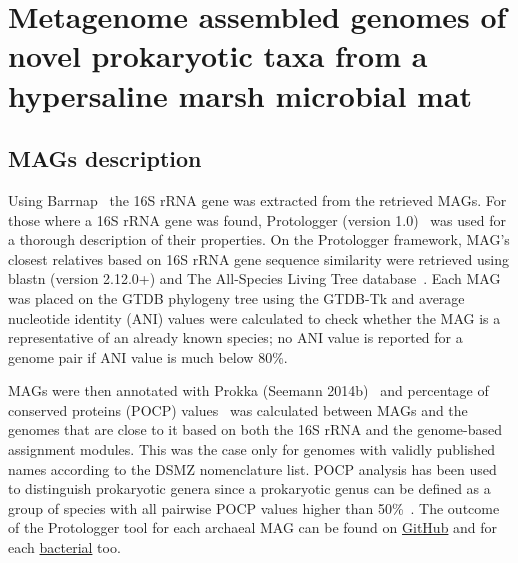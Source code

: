 \chapter{Metagenome assembled genomes of novel prokaryotic taxa from a hypersaline marsh microbial mat}
\label{app:mags}

\section{MAGs description}

    Using Barrnap~\citep{seemann_barrnap_2014} the 16S rRNA gene was extracted from the retrieved MAGs. 
    For those where a 16S rRNA gene was found, Protologger (version 1.0)~\citep{hitch_automated_2021} 
    was used for a thorough description of their properties. 
    On the Protologger framework, MAG’s closest relatives based on 16S rRNA gene sequence similarity were retrieved using 
    blastn (version 2.12.0+) and The All-Species Living Tree database~\citep{ludwig_release_2021}. 
    Each MAG was placed on the GTDB phylogeny tree using the GTDB-Tk and average nucleotide identity (ANI) values 
    were calculated to check whether the MAG is a representative of an already known species; 
    no ANI value is reported for a genome pair if ANI value is much below 80\%. 

    MAGs were then annotated with Prokka (Seemann 2014b)~\citep{seemann_prokka_2014} 
    and percentage of conserved proteins (POCP) values~\citep{qin_proposed_2014}  
    was calculated between MAGs and the genomes that are close to it based on both the 16S rRNA and the genome-based assignment modules. 
    This was the case only for genomes with validly published names according to the DSMZ nomenclature list. 
    POCP analysis has been used to distinguish prokaryotic genera since a prokaryotic genus can be defined as a group of species 
    with all pairwise POCP values higher than 50\%~\citep{qin_proposed_2014}. 
    The outcome of the Protologger tool for each archaeal MAG can be found on 
    \href{https://github.com/hariszaf/karpathos-swamp/tree/main/MAGs/arc/with_16S}{GitHub} 
    and for each \href{https://github.com/hariszaf/karpathos-swamp/tree/main/MAGs/bac/with_16S}{bacterial} too. 

